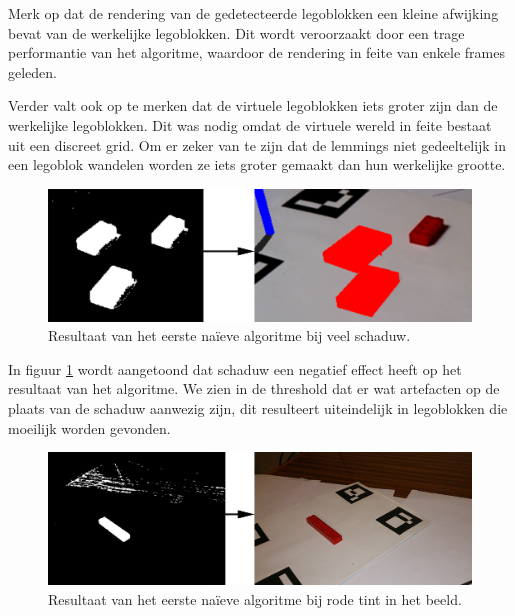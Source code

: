Merk op dat de rendering van de gedetecteerde legoblokken een kleine afwijking bevat van de werkelijke legoblokken. Dit wordt veroorzaakt door een trage performantie van het algoritme, waardoor de rendering in feite van enkele frames geleden.

Verder valt ook op te merken dat de virtuele legoblokken iets groter zijn dan de werkelijke legoblokken. Dit was nodig omdat de virtuele wereld in feite bestaat uit een discreet grid. Om er zeker van te zijn dat de lemmings niet gedeeltelijk in een legoblok wandelen worden ze iets groter gemaakt dan hun werkelijke grootte.

\begin{figure}
  \centering
  \includegraphics[width=\linewidth]{img/alg1Shadow}
  \caption{Resultaat van het eerste na\"ieve algoritme bij veel schaduw.}
  \label{fig:algo1_shadow}
\end{figure}

In figuur \ref{fig:algo1_shadow} wordt aangetoond dat schaduw een negatief effect heeft op het resultaat van het algoritme. We zien in de threshold dat er wat artefacten op de plaats van de schaduw aanwezig zijn, dit resulteert uiteindelijk in legoblokken die moeilijk worden gevonden.

\begin{figure}
  \centering
  \includegraphics[width=\linewidth]{img/alg1NonWhiteBg}
  \caption{Resultaat van het eerste na\"ieve algoritme bij rode tint in het beeld.}
  \label{fig:algo1_nonwhitebg}
\end{figure}

